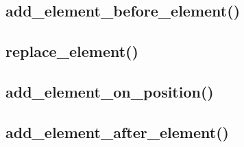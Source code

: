\documentclass[12pt, a4paper]{article}
\begin{document}
\subsection{add\_element\_before\_element()}







\subsection{replace\_element()}







\subsection{add\_element\_on\_position()}







\subsection{add\_element\_after\_element()}




\end{document}
